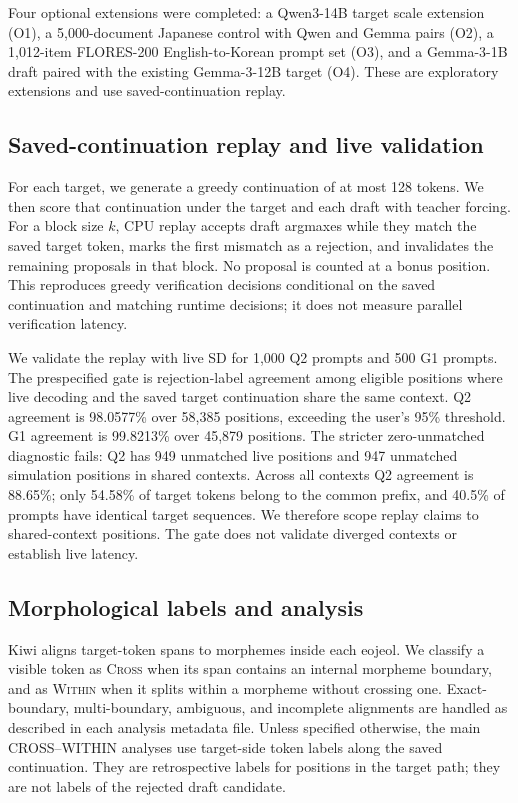 \documentclass[11pt]{article}
\begin{document}
Four optional extensions were completed: a Qwen3-14B target scale extension
(O1), a 5,000-document Japanese control with Qwen and Gemma pairs (O2), a
1,012-item FLORES-200 English-to-Korean prompt set (O3), and a Gemma-3-1B
draft paired with the existing Gemma-3-12B target (O4). These are exploratory
extensions and use saved-continuation replay.

\subsection{Saved-continuation replay and live validation}

For each target, we generate a greedy continuation of at most 128 tokens. We
then score that continuation under the target and each draft with teacher
forcing. For a block size $k$, CPU replay accepts draft argmaxes while they
match the saved target token, marks the first mismatch as a rejection, and
invalidates the remaining proposals in that block. No proposal is counted at a
bonus position. This reproduces greedy verification decisions conditional on
the saved continuation and matching runtime decisions; it does not measure
parallel verification latency.

We validate the replay with live SD for 1,000 Q2 prompts and 500 G1 prompts.
The prespecified gate is rejection-label agreement among eligible positions
where live decoding and the saved target continuation share the same context.
Q2 agreement is 98.0577\% over 58,385 positions, exceeding the user's 95\%
threshold. G1 agreement is 99.8213\% over 45,879 positions. The stricter
zero-unmatched diagnostic fails: Q2 has 949 unmatched live positions and 947
unmatched simulation positions in shared contexts. Across all contexts Q2
agreement is 88.65\%; only 54.58\% of target tokens belong to the common
prefix, and 40.5\% of prompts have identical target sequences. We therefore
scope replay claims to shared-context positions. The gate does not validate
diverged contexts or establish live latency.

\subsection{Morphological labels and analysis}

Kiwi aligns target-token spans to morphemes inside each eojeol. We classify a
visible token as \textsc{Cross} when its span contains an internal morpheme
boundary, and as \textsc{Within} when it splits within a morpheme without
crossing one. Exact-boundary, multi-boundary, ambiguous, and incomplete
alignments are handled as described in each analysis metadata file. Unless
specified otherwise, the main CROSS--WITHIN analyses use target-side token
labels along the saved continuation. They are retrospective labels for
positions in the target path; they are not labels of the rejected draft
candidate.
\end{document}
